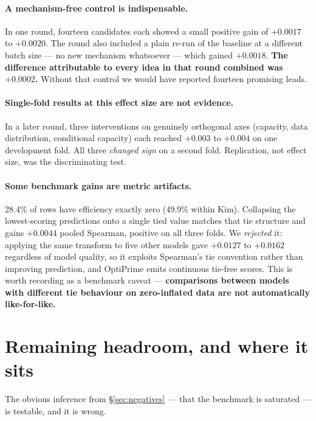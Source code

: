 \documentclass[11pt]{article}
\begin{document}
\paragraph{A mechanism-free control is indispensable.}
In one round, fourteen candidates each showed a small positive gain of $+0.0017$ to
$+0.0020$. The round also included a plain re-run of the baseline at a different batch
size --- no new mechanism whatsoever --- which gained $+0.0018$. \textbf{The difference
attributable to every idea in that round combined was $+0.0002$.} Without that control
we would have reported fourteen promising leads.

\paragraph{Single-fold results at this effect size are not evidence.}
In a later round, three interventions on genuinely orthogonal axes (capacity, data
distribution, conditional capacity) each reached $+0.003$ to $+0.004$ on one
development fold. All three \emph{changed sign} on a second fold. Replication, not
effect size, was the discriminating test.

\paragraph{Some benchmark gains are metric artifacts.}
28.4\% of rows have efficiency exactly zero (49.9\% within Kim). Collapsing the
lowest-scoring predictions onto a single tied value matches that tie structure and
gains $+0.0044$ pooled Spearman, positive on all three folds. We \emph{rejected} it:
applying the same transform to five other models gave $+0.0127$ to $+0.0162$
regardless of model quality, so it exploits Spearman's tie convention rather than
improving prediction, and OptiPrime emits continuous tie-free scores. This is worth
recording as a benchmark caveat --- \textbf{comparisons between models with different
tie behaviour on zero-inflated data are not automatically like-for-like.}

\section{Remaining headroom, and where it sits}

The obvious inference from \S\ref{sec:negatives} --- that the benchmark is saturated
--- is testable, and it is wrong.
\end{document}
